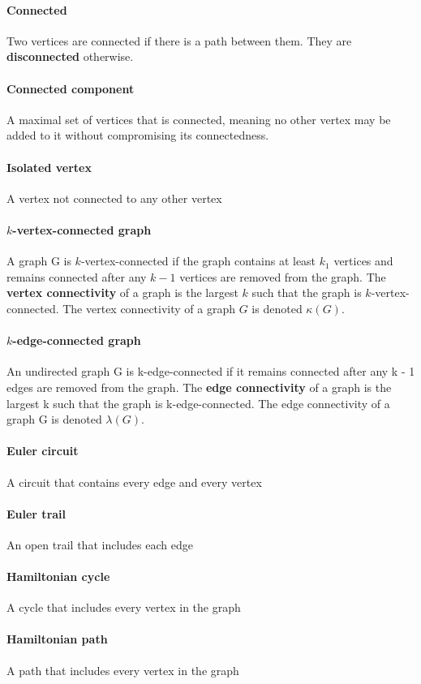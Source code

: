 \documentclass[a4paper]{article}
\begin{document}
  \paragraph{Connected} Two vertices are connected if there is a path between them. They are \textbf{disconnected} otherwise.
  \paragraph{Connected component} A maximal set of vertices that is connected, meaning no other vertex may be added to it without compromising its connectedness.
  \paragraph{Isolated vertex} A vertex not connected to any other vertex
  \paragraph{$k$-vertex-connected graph} A graph G is $k$-vertex-connected if the graph contains at least $k  _ 1$ vertices and remains connected after any $k -1$ vertices are removed from the graph. The \textbf{vertex connectivity} of a graph is the largest $k$ such that the graph is $k$-vertex-connected. The vertex connectivity of a graph $G$ is denoted $\kappa(G)$.
  \paragraph{$k$-edge-connected graph}An undirected graph G is k-edge-connected if it remains connected after any k - 1 edges are removed from the graph. The \textbf{edge connectivity} of a graph is the largest k such that the graph is k-edge-connected. The edge connectivity of a graph G is denoted $\lambda(G)$.
  \paragraph{Euler circuit} A circuit that contains every edge and every vertex
  \paragraph{Euler trail} An open trail that includes each edge
  \paragraph{Hamiltonian cycle} A cycle that includes every vertex in the graph
  \paragraph{Hamiltonian path} A path that includes every vertex in the graph
\end{document}
